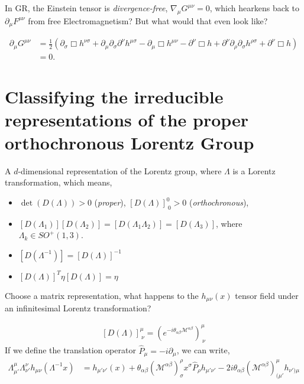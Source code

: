 In GR, the Einstein tensor is \textit{divergence-free}, $\nabla_{\mu}G^{\mu\nu}=0$, which hearkens back to $\partial_{\mu}F^{\mu\nu}$ from free Electromagnetism? But what would that even look like?

\begin{equation}
    \begin{split}
         \partial_{\mu}G^{\mu\nu} &= \frac{1}{2}\left(\partial_{\sigma}\Box h^{\nu\sigma} + \partial_{\mu}\partial_{\sigma}\partial^{\nu}h^{\mu\sigma} - \partial_{\mu}\Box h^{\mu\nu} - \partial^{\nu}\Box h + \partial^{\nu}\partial_{\rho}\partial_{\sigma}h^{\rho\sigma} + \partial^{\nu}\Box h \right) \\
         &= 0.
    \end{split}
\end{equation}

\section{Classifying the irreducible representations of the proper orthochronous Lorentz Group}
A $d$-dimensional representation of the Lorentz group, where $\Lambda$ is a Lorentz transformation, which means,  
\begin{itemize}
    \item  $\det(D(\Lambda))>0$ (\textit{proper}), $[D(\Lambda)]^{0}_{\ 0} > 0$ (\textit{orthochronous}),
    \item $[D(\Lambda_1)][D(\Lambda_2)]=[D(\Lambda_1\Lambda_2)] = [D(\Lambda_3)]$, where $\Lambda_{k}\in SO^{+}(1,3)$.
    \item $[D(\Lambda^{-1})] = [D(\Lambda)]^{-1}$
    \item $[D(\Lambda)]^{T}\eta[D(\Lambda)]=\eta$
\end{itemize}
Choose a matrix representation, what happens to the $h_{\mu\nu}(x)$ tensor field under an infinitesimal Lorentz transformation?

\begin{equation}
    \begin{split}
        [D(\Lambda)]^{\mu}_{\ \nu} = \left(e^{-i\theta_{\alpha\beta} \mathcal{M}^{\alpha\beta}}\right)^{\mu}_{\ \nu} 
    \end{split}
\end{equation}
If we define the translation operator $\hat{P}_{\mu} = -i\partial_{\mu}$, we can write,
\begin{equation}
    \begin{split}
        \Lambda^{\mu}_{\mu'}\Lambda^{\nu}_{\nu'} h_{\mu\nu}\left(\Lambda^{-1}x\right)&=h_{\mu'\nu'}(x) + \theta_{\alpha\beta}\left(\mathcal{M}^{\alpha\beta}\right)^{\rho}_{\sigma}x^{\sigma}\hat{P}_{\rho}h_{\mu'\nu'} - 2i\theta_{\alpha\beta}\left(\mathcal{M}^{\alpha\beta}\right)^{\mu}_{(\mu'}h_{\nu')\mu}
    \end{split}
\end{equation}

